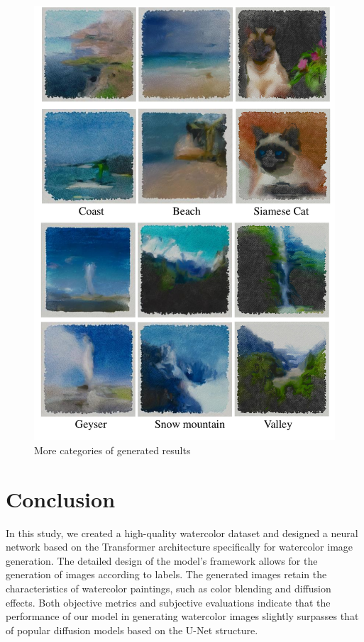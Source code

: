\documentclass[12pt]{report}
\begin{document}
\newpage
\begin{figure}[thbp]
    \centering
    \includegraphics[width=15cm]{image/more.pdf}
    \caption{More categories of generated results}
    \label{fig:more}
\end{figure}

\chapter{Conclusion}
In this study, we created a high-quality watercolor dataset and designed a neural network based on the Transformer architecture specifically for watercolor image generation. The detailed design of the model's framework allows for the generation of images according to labels. The generated images retain the characteristics of watercolor paintings, such as color blending and diffusion effects. Both objective metrics and subjective evaluations indicate that the performance of our model in generating watercolor images slightly surpasses that of popular diffusion models based on the U-Net structure.
\end{document}
